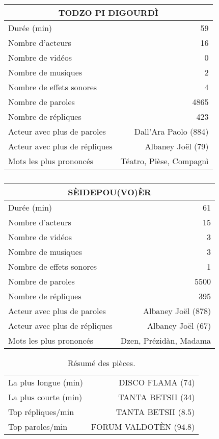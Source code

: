     \begin{table}[]
    \centering
    \caption{}
    \begin{tabular}{lr}\toprule\multicolumn{2}{c}{TODZO PI DIGOURDÌ} \\\midrule
\multicolumn{1}{l}{Durée (min)}&59\\
\multicolumn{1}{l}{Nombre d'acteurs}&16\\
\multicolumn{1}{l}{Nombre de vidéos}&0\\
\multicolumn{1}{l}{Nombre de musiques}&2\\
\multicolumn{1}{l}{Nombre de effets sonores}&4\\
\multicolumn{1}{l}{Nombre de paroles}&4865\\
\multicolumn{1}{l}{Nombre de répliques}&423\\
\multicolumn{1}{l}{Acteur avec plus de paroles}&Dall'Ara Paolo (884)\\
\multicolumn{1}{l}{Acteur avec plus de répliques}&Albaney Joël (79)\\
\multicolumn{1}{l}{Mots les plus prononcés}&Téatro, Pièse, Compagnì\\
    \bottomrule
    \end{tabular}%
    \end{table}
    \begin{table}[]
    \centering
    \caption{}
    \begin{tabular}{lr}\toprule\multicolumn{2}{c}{SÈIDEPOU(VO)ÈR} \\\midrule
\multicolumn{1}{l}{Durée (min)}&61\\
\multicolumn{1}{l}{Nombre d'acteurs}&15\\
\multicolumn{1}{l}{Nombre de vidéos}&3\\
\multicolumn{1}{l}{Nombre de musiques}&3\\
\multicolumn{1}{l}{Nombre de effets sonores}&1\\
\multicolumn{1}{l}{Nombre de paroles}&5500\\
\multicolumn{1}{l}{Nombre de répliques}&395\\
\multicolumn{1}{l}{Acteur avec plus de paroles}&Albaney Joël (878)\\
\multicolumn{1}{l}{Acteur avec plus de répliques}&Albaney Joël (67)\\
\multicolumn{1}{l}{Mots les plus prononcés}&Dzen, Prézidàn, Madama\\
    \bottomrule
    \end{tabular}%
    \end{table}
\begin{table}[h]
\centering
\caption{Résumé des pièces.}
\begin{tabular}{lr}
    \toprule
La plus longue (min) & DISCO FLAMA (74) \\
La plus courte (min) & TANTA BETSII (34) \\
Top répliques/min & TANTA BETSII (8.5) \\
Top paroles/min & FORUM VALDOTÈN (94.8) \\
\bottomrule
\end{tabular}%
\end{table}